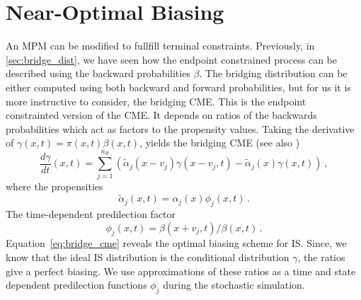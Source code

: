 \section{Near-Optimal Biasing}
An \ac{MPM} can be modified to fullfill terminal constraints.
Previously, in \autoref{sec:bridge_dist}, we have seen how the endpoint constrained process can be described using the backward probabilities $\beta$.
The bridging distribution can be either computed using both backward and forward probabilities, but for us it is more instructive to consider, the bridging \ac{CME}.
This is the endpoint constrainted version of the \ac{CME}.
It depends on ratios of the backwards probabilities which act as factors to the propensity values.
Taking the derivative of $\gamma(x,t)=\pi(x,t)\beta(x,t)$, yields the bridging \ac{CME} (see also \citet{huang2016reconstructing})
\begin{equation}\label{eq:bridge_cme}
    \frac{d\gamma}{d t} ( x,t) =
    \sum_{j=1}^{n_R}\left(
        \tilde{\alpha}_j( x- v_j)\gamma( x- v_j,t) - \tilde{\alpha}_j( x)\gamma( x,t)
    \right)\,,
\end{equation}
where the propensities
\begin{equation}
    \tilde{\alpha}_j(x, t) = \alpha_j(x)\phi_j(x, t)\,.
\end{equation}
The time-dependent predilection factor
\begin{equation}\label{eq:dyn_predilection}
    \phi_j(x, t) = {\beta(x + v_j, t)}/{\beta(x, t)}\,.
\end{equation}
Equation~\eqref{eq:bridge_cme} reveals the optimal biasing scheme for \ac{IS}.
Since, we know that the ideal \ac{IS} distribution is the conditional distribution $\gamma$, the ratios
give a perfect biasing.
We use approximations of these ratios as a time and state dependent predilection functions $\phi_j$ during the stochastic simulation.

